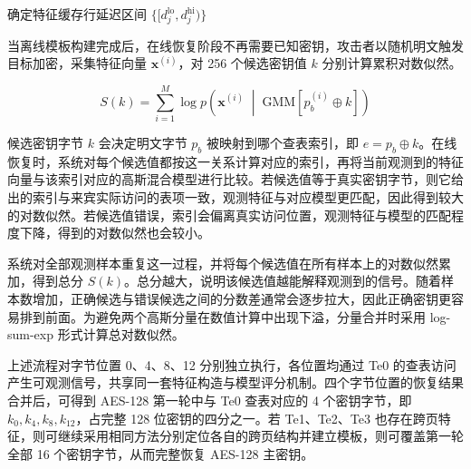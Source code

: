 \begin{algorithm}[htbp]
  \caption{离线模板构建与在线密钥恢复}
  \label{alg:template_recover}
  \BlankLine
  确定特征缓存行延迟区间 $\{[d_j^{\mathrm{lo}}, d_j^{\mathrm{hi}})\}$ \;
  \BlankLine
\end{algorithm}

当离线模板构建完成后，在线恢复阶段不再需要已知密钥，攻击者以随机明文触发目标加密，采集特征向量 $\mathbf{x}^{(i)}$，对 256 个候选密钥值 $k$ 分别计算累积对数似然。

\begin{equation}
  S(k) = \sum_{i=1}^{M} \log p\!\left(\mathbf{x}^{(i)} \;\middle|\; \mathrm{GMM}\!\left[p_b^{(i)} \oplus k\right]\right)
  \label{eq:gmm_score}
\end{equation}

候选密钥字节 $k$ 会决定明文字节 $p_b$ 被映射到哪个查表索引，即 $e = p_b \oplus k$。在线恢复时，系统对每个候选值都按这一关系计算对应的索引，再将当前观测到的特征向量与该索引对应的高斯混合模型进行比较。若候选值等于真实密钥字节，则它给出的索引与来宾实际访问的表项一致，观测特征与对应模型更匹配，因此得到较大的对数似然。若候选值错误，索引会偏离真实访问位置，观测特征与模型的匹配程度下降，得到的对数似然也会较小。

系统对全部观测样本重复这一过程，并将每个候选值在所有样本上的对数似然累加，得到总分 $S(k)$。总分越大，说明该候选值越能解释观测到的信号。随着样本数增加，正确候选与错误候选之间的分数差通常会逐步拉大，因此正确密钥更容易排到前面。为避免两个高斯分量在数值计算中出现下溢，分量合并时采用 log-sum-exp 形式计算总对数似然。

上述流程对字节位置 0、4、8、12 分别独立执行，各位置均通过 Te0 的查表访问产生可观测信号，共享同一套特征构造与模型评分机制。四个字节位置的恢复结果合并后，可得到 AES-128 第一轮中与 Te0 查表对应的 4 个密钥字节，即 $k_0, k_4, k_8, k_{12}$，占完整 128 位密钥的四分之一。若 Te1、Te2、Te3 也存在跨页特征，则可继续采用相同方法分别定位各自的跨页结构并建立模板，则可覆盖第一轮全部 16 个密钥字节，从而完整恢复 AES-128 主密钥。

